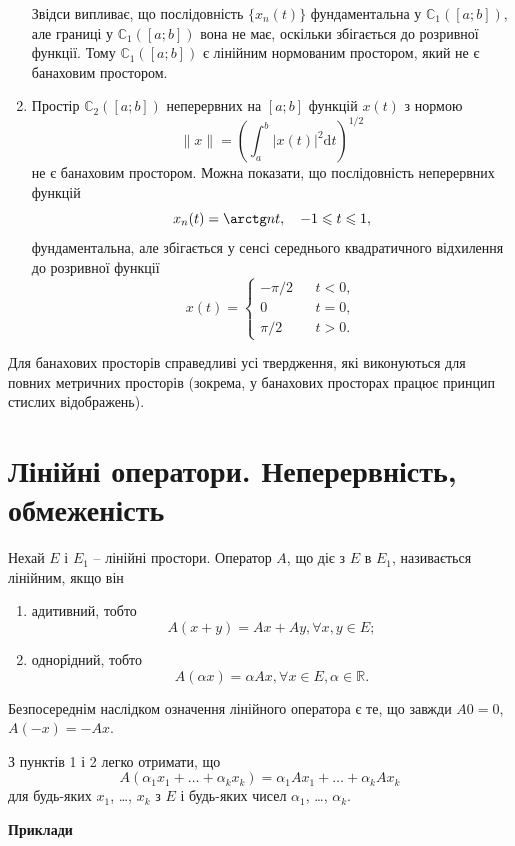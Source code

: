 \documentclass[14pt,twoside]{extreport}
\theoremstyle{mystyle}
\numberwithin{equation}{chapter}
\begin{document}
\begin{enumerate}
	Звідси випливає, що послідовність $\{x_n(t)\}$ фундаментальна у $\mathbb{C}_1([a; b])$, але границі у $\mathbb{C}_1([a; b])$ вона не має, оскільки збігається до розривної функції.
	Тому $\mathbb{C}_1([a; b])$ є лінійним нормованим простором, який не є банаховим простором.
	\item Простір $\mathbb{C}_2([a; b])$ неперервних на $[a; b]$ функцій $x(t)$ з нормою
	\[
	\|x\| = \left(\int_{a}^{b}|x(t)|^2\mathrm{d}t\right)^{1/2}
	\]
	не є банаховим простором. Можна показати, що послідовність неперервних функцій
	\[
	x_n(t)=\arctg nt, \quad -1 \leqslant t \leqslant 1,
	\]
	фундаментальна, але збігається у сенсі середнього квадратичного відхилення до розривної функції
	\[
	x(t) = \left\{
	\begin{array}{cll}
	-\pi/2 & \textrm{} & t<0,\\
	0 & \textrm{} & t=0,\\
	\pi/2 & \textrm{} & t>0.
	\end{array}
	\right.
	\]
\end{enumerate}

Для банахових просторів справедливі усі твердження, які виконуються для повних метричних просторів (зокрема, у банахових просторах працює принцип стислих відображень).

\section{Лінійні оператори. Неперервність, обмеженість}

Нехай $E$ і $E_1$ -- лінійні простори. Оператор $A$, що діє з $E$ в $E_1$, називається лінійним, якщо він
\begin{enumerate}
	\item адитивний, тобто
	\[
	A(x+y) = Ax+Ay, \forall x, y \in E;
	\]
	\item однорідний, тобто
	\[
	A(\alpha x) = \alpha Ax, \forall x \in E, \alpha \in \mathbb{R}.
	\]
\end{enumerate}

Безпосереднім наслідком означення лінійного оператора є те, що завжди $A0=0$, $A(-x)=-Ax$.

З пунктів 1 і 2 легко отримати, що
\[
A(\alpha_1x_1 + \ldots + \alpha_kx_k) = \alpha_1 Ax_1 + \ldots + \alpha_k Ax_k
\]
для будь-яких $x_1$, \ldots, $x_k$ з $E$ і будь-яких чисел $\alpha_1$, \ldots, $\alpha_k$.

\textbf{Приклади}
\end{document}
